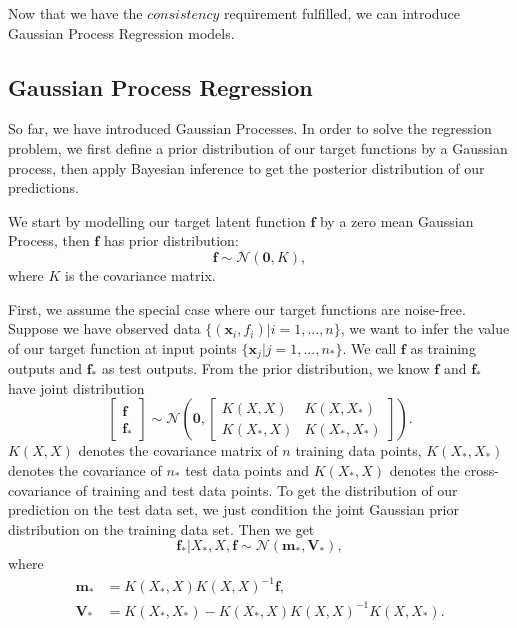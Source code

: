 \documentclass[11pt,a4paper]{article}
\theoremstyle{definition}
\numberwithin{equation}{section}
\let\vec\mathbf
\begin{document}
Now that we have the $consistency$ requirement fulfilled, we can introduce Gaussian Process Regression models.
\subsection{Gaussian Process Regression}
So far, we have introduced Gaussian Processes. In order to solve the regression problem, we first define a prior distribution of our target functions by a Gaussian process, then apply Bayesian inference to get the posterior distribution of our predictions. 

We start by modelling our target latent function $\vec f$ by a zero mean Gaussian Process, then $\vec f$ has prior distribution:
\begin{equation} \label{noise-free}
	\vec f \sim \mathcal{N}(\vec 0, K),
\end{equation}
where $K$ is the covariance matrix.

First, we assume the special case where our target functions are noise-free. Suppose we have observed data $\{(\vec x_i,f_i)|i=1,...,n\}$, we want to infer the value of our target function at input points $\{\vec x_j | j = 1,...,n_*\}$. We call $\vec f$ as training outputs and $\vec f_*$ as test outputs. From the prior distribution, we know 
$\vec f$ and $\vec f_*$ have joint distribution
\begin{equation} \label{}
	\begin{bmatrix}
	\vec f\\
	\vec f_*
	\end{bmatrix}
	\sim
	\mathcal{N}\left(\vec 0, 
	\begin{bmatrix}
	K(X,X) & K(X,X_*)\\
	K(X_*,X) & K(X_*,X_*)
	\end{bmatrix}
	\right).
\end{equation}
$K(X,X)$ denotes the covariance matrix of $n$ training data points, $K(X_*,X_*)$ denotes the covariance of $n_*$ test data points and $K(X_*,X)$ denotes the cross-covariance of training and test data points. To get the distribution of our prediction on the test data set, we just condition the joint Gaussian prior distribution on the training data set. Then we get
\begin{equation} \label{eq:pred1}
	\vec f_* | X_*, X, \vec f \sim \mathcal N (\vec m_*, \vec V_*),
\end{equation}
where
\begin{equation} \label{eq:pred2}
\begin{split}
\vec m_* &= K(X_*,X)K(X,X)^{-1}\vec f,\\
\vec V_* &= K(X_*,X_*) - K(X_*,X)K(X,X)^{-1}K(X,X_*).
\end{split}
\end{equation}
\end{document}
